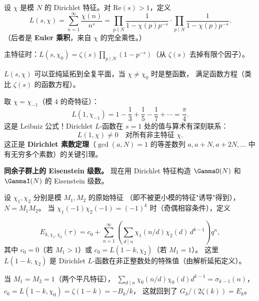 \begin{definition}[Dirichlet $L$-函数]
\label{def:dirichlet-L-function}
设 $\chi$ 是模 $N$ 的 Dirichlet 特征。对 $\mathrm{Re}(s) > 1$，定义
\[
  L(s, \chi) = \sum_{n=1}^{\infty} \frac{\chi(n)}{n^s}
  = \prod_{p \nmid N} \frac{1}{1 - \chi(p)p^{-s}} \cdot \prod_{p \mid N} \frac{1}{1 - \chi(p)p^{-s}}.
\]
（后者是 \textbf{Euler 乘积}，来自 $\chi$ 的完全乘性。）

主特征时：$L(s, \chi_0) = \zeta(s) \prod_{p \mid N}(1 - p^{-s})$（从 $\zeta(s)$ 去掉有限个因子）。

$L(s, \chi)$ 可以亚纯延拓到全复平面，当 $\chi \neq \chi_0$ 时是整函数，
满足函数方程（类比 $\zeta(s)$ 的函数方程）。
\end{definition}

\begin{example}[$L(1, \chi_{-1})$ 与 $\pi$]
\label{ex:L-function-value}
取 $\chi = \chi_{-1}$（模 $4$ 的奇特征）：
\[
  L(1, \chi_{-1}) = 1 - \frac{1}{3} + \frac{1}{5} - \frac{1}{7} + \cdots = \frac{\pi}{4}.
\]
这是 Leibniz 公式！Dirichlet $L$-函数在 $s = 1$ 处的值与算术有深刻联系：
\[
  L(1, \chi) \neq 0 \quad \text{对所有非主特征 } \chi.
\]
这正是 \textbf{Dirichlet 素数定理}（$\gcd(a,N)=1$ 的等差数列 $a, a+N, a+2N, \ldots$
中有无穷多个素数）的关键引理。
\end{example}

\textbf{同余子群上的 Eisenstein 级数。}
现在用 Dirichlet 特征构造 $\GammaO(N)$ 和 $\GammaI(N)$ 的 Eisenstein 级数。

设 $\chi_1, \chi_2$ 分别是模 $M_1, M_2$ 的原始特征
（即不被更小模的特征"诱导"得到），$N = M_1 M_2$。
当 $\chi_1(-1)\chi_2(-1) = (-1)^k$ 时（奇偶相容条件），定义

\begin{definition}[扭曲 Eisenstein 级数]
\label{def:twisted-eisenstein}
\[
  E_{k,\chi_1,\chi_2}(\tau)
  = c_0 + \sum_{n=1}^{\infty} \left(\sum_{d \mid n} \chi_1(n/d)\chi_2(d)\, d^{k-1}\right) q^n,
\]
其中 $c_0 = 0$（若 $M_1 > 1$）或 $c_0 = L(1-k, \chi_2)$（若 $M_1 = 1$）。
这里 $L(1-k, \chi_2)$ 是 Dirichlet $L$-函数在非正整数处的特殊值（由解析延拓定义）。
\end{definition}

\begin{example}[最简单的扭曲——$\chi_1 = \chi_0, \chi_2 = \chi_0$（全模群）]
当 $M_1 = M_2 = 1$（两个平凡特征），
$\sum_{d \mid n} \chi_0(n/d)\chi_0(d) d^{k-1} = \sigma_{k-1}(n)$，
$c_0 = L(1-k, \chi_0) = \zeta(1-k) = -B_k/k$，
这就回到了 $G_k/(2\zeta(k)) = E_k$。
\end{example}

